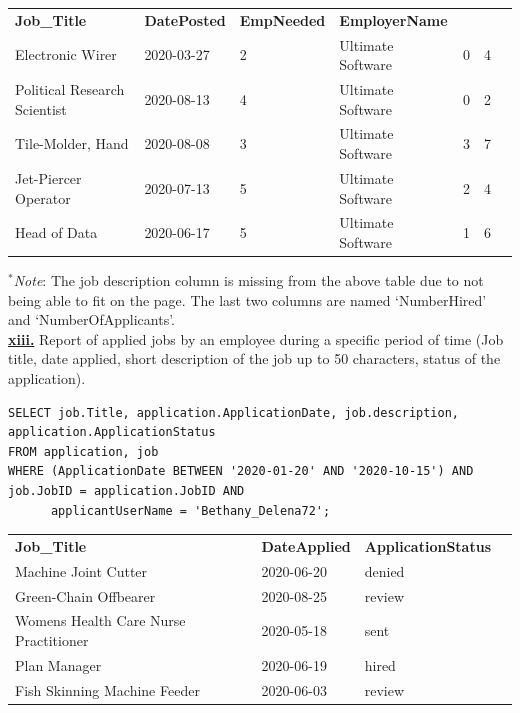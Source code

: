 \documentclass[11pt]{article}
\begin{document}
\begin{table}[!htbp]
\begin{tabular}{lllllll}
\textbf{Job\_Title}  & \textbf{DatePosted}  & \textbf{EmpNeeded} & \textbf{EmployerName} &  & \\
Electronic Wirer              & 2020-03-27 & 2 & Ultimate Software & 0 & 4 \\
Political Research Scientist  & 2020-08-13 & 4 & Ultimate Software & 0 & 2 \\
Tile-Molder, Hand             & 2020-08-08 & 3 & Ultimate Software & 3 & 7 \\
Jet-Piercer Operator          & 2020-07-13 & 5 & Ultimate Software & 2 & 4 \\
Head of Data                  & 2020-06-17 & 5 & Ultimate Software & 1 & 6 \\
\end{tabular}
\end{table}

$^{*}$\textit{Note}: The job description column is missing from the above table due to not being able to fit on the page. The last two columns are named `NumberHired' and `NumberOfApplicants'.\\

\underline{\textbf{xiii.}} Report of applied jobs by an employee during a specific period of time
(Job title, date applied, short description of the job up to 50 characters,
status of the application).

\begin{verbatim}
SELECT job.Title, application.ApplicationDate, job.description, 
application.ApplicationStatus
FROM application, job
WHERE (ApplicationDate BETWEEN '2020-01-20' AND '2020-10-15') AND 
job.JobID = application.JobID AND
      applicantUserName = 'Bethany_Delena72';
\end{verbatim}

\begin{table}[!htbp]
\begin{tabular}{llll}
\textbf{Job\_Title}                 & \textbf{DateApplied} & \textbf{ApplicationStatus} \\
Machine Joint Cutter                  & 2020-06-20 & denied \\
Green-Chain Offbearer                 & 2020-08-25 & review \\
Womens Health Care Nurse Practitioner & 2020-05-18 & sent   \\
Plan Manager                          & 2020-06-19 & hired  \\
Fish Skinning Machine Feeder          & 2020-06-03 & review \\
\end{tabular}
\end{table}
\end{document}
